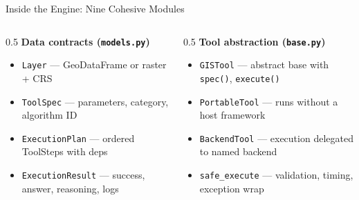 \documentclass[aspectratio=169,11pt]{beamer}
\begin{document}
\begin{frame}{Inside the Engine: Nine Cohesive Modules}
  \vspace{0.3em}
  \begin{columns}[T,onlytextwidth]
    \begin{column}{0.5\textwidth}
      \small\textbf{Data contracts (\texttt{models.py})}
      \begin{itemize}
        \item \texttt{Layer} --- GeoDataFrame or raster + CRS
        \item \texttt{ToolSpec} --- parameters, category, algorithm ID
        \item \texttt{ExecutionPlan} --- ordered ToolSteps with deps
        \item \texttt{ExecutionResult} --- success, answer, reasoning, logs
      \end{itemize}
    \end{column}
    \begin{column}{0.5\textwidth}
      \small\textbf{Tool abstraction (\texttt{base.py})}
      \begin{itemize}
        \item \texttt{GISTool} --- abstract base with \texttt{spec()}, \texttt{execute()}
        \item \texttt{PortableTool} --- runs without a host framework
        \item \texttt{BackendTool} --- execution delegated to named backend
        \item \texttt{safe\_execute} --- validation, timing, exception wrap
      \end{itemize}
    \end{column}
  \end{columns}
\end{frame}
\end{document}
